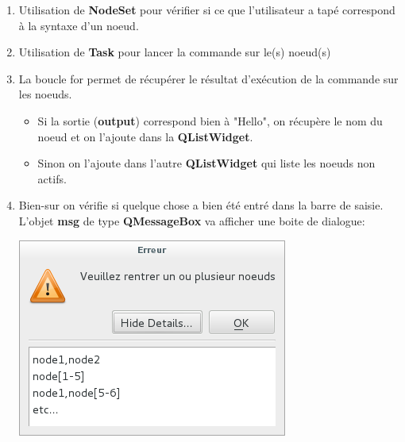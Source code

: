 \documentclass[a4paper,11pt]{article}
\begin{document}
\begin{enumerate}
\item Utilisation de \textbf{NodeSet} pour vérifier si ce que l'utilisateur a tapé correspond à la syntaxe d'un noeud.
\item Utilisation de \textbf{Task} pour lancer la commande sur le(s) noeud(s)
\item La boucle for permet de récupérer le résultat d'exécution de la commande sur les noeuds.
\begin{itemize}
\item Si la sortie (\textbf{output}) correspond bien à "Hello", on récupère le nom du noeud et on l'ajoute dans la \textbf{QListWidget}.
\item Sinon on l'ajoute dans l'autre \textbf{QListWidget} qui liste les noeuds non actifs.
\end{itemize}
\item Bien-sur on vérifie si quelque chose a bien été entré dans la barre de saisie. L'objet \textbf{msg} de type \textbf{QMessageBox} va afficher une boite de dialogue:\\
\linebreak
\begin{center}
\includegraphics[scale=0.8]{messagebox.png} 
\end{center}

\end{enumerate}
 
\end{document}
